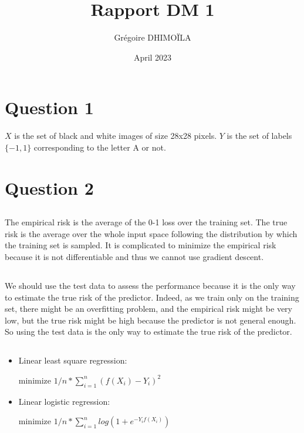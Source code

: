 \documentclass{article}
\title{Rapport DM 1}
\author{Grégoire DHIMOÏLA}
\date{April 2023}
\begin{document}
\maketitle

\section{Question 1}

$X$ is the set of black and white images of size 28x28 pixels. $Y$ is the set of labels $\{-1,1\}$ corresponding to the letter A or not.

\section{Question 2}

\subsection{}

The empirical risk is the average of the 0-1 loss over the training set. The true risk is the average over the whole input space following the distribution by which the training set is sampled. It is complicated to minimize the empirical risk because it is not differentiable and thus we cannot use gradient descent.

\subsection{}

We should use the test data to assess the performance because it is the only way to estimate the true risk of the predictor. Indeed, as we train only on the training set, there might be an overfitting problem, and the empirical risk might be very low, but the true risk might be high because the predictor is not general enough. So using the test data is the only way to estimate the true risk of the predictor.

\subsection{}
\begin{itemize}
    \item 
Linear least square regression:

minimize $1/n * \sum_{i=1}^n (f(X_i) - Y_i)^2$
\item 
Linear logistic regression:

minimize $1/n * \sum_{i=1}^n log(1 + e^{-Y_i f(X_i)})$
\end{itemize}
\end{document}
